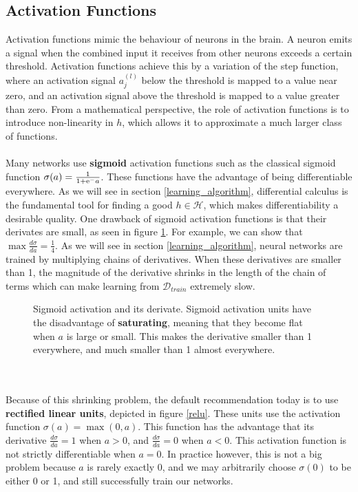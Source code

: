 \subsection{Activation Functions}
\label{activation_functions}
Activation functions mimic the behaviour of neurons in the brain. A neuron emits a signal when the combined input it receives from other neurons exceeds a certain threshold. Activation functions achieve this by a variation of the step function, where an activation signal $a^{(l)}_j$ below the threshold is mapped to a value near zero, and an activation signal above the threshold is mapped to a value greater than zero. From a mathematical perspective, the role of activation functions is to introduce non-linearity in $h$, which allows it to approximate a much larger class of functions.
\\\\
Many networks use \textbf{sigmoid} activation functions such as the classical sigmoid function $\sigma(a) = \frac{1}{1 + \mathrm{e}^-a}$. These functions have the advantage of being differentiable everywhere. As we will see in section \ref{learning_algorithm}, differential calculus is the fundamental tool for finding a good $h \in \mathcal{H}$, which makes differentiability a desirable quality. One drawback of sigmoid activation functions is that their derivates are small, as seen in figure \ref{sigmoid}. For example, we can show that $\max \frac{d\sigma}{da} = \frac{1}{4}$. As we will see in section \ref{learning_algorithm}, neural networks are trained by multiplying chains of derivatives. When these derivatives are smaller than 1, the magnitude of the derivative shrinks in the length of the chain of terms which can make learning from $\mathcal{D}_{train}$ extremely slow.
\begin{figure}
	\centering
	
	\caption{Sigmoid activation and its derivate. Sigmoid activation units have the disadvantage of \textbf{saturating}, meaning that they become flat when $a$ is large or small. This makes the derivative smaller than 1 everywhere, and much smaller than 1 almost everywhere.}
	\label{sigmoid}
\end{figure}
\\\\
Because of this shrinking problem, the default recommendation today is to use \textbf{rectified linear units}, depicted in figure \ref{relu}. These units use the activation function $\sigma(a) = \max(0, a)$. This function has the advantage that its derivative $\frac{d\sigma}{da} = 1$ when $a > 0$, and $\frac{d\sigma}{da} = 0$ when $a < 0$. This activation function is not strictly differentiable when $a = 0$. In practice however, this is not a big problem because $a$ is rarely exactly 0, and we may arbitrarily choose $\sigma(0)$ to be either 0 or 1, and still successfully train our networks.
